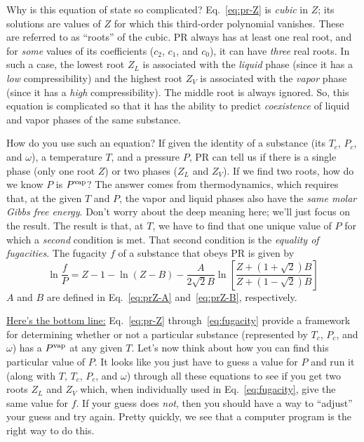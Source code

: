 \documentclass[11pt]{article}
\begin{document}
Why is this equation of state so complicated?  Eq.~\ref{eq:pr-Z} is {\em cubic} in $Z$; its solutions are values of $Z$ for which this third-order polynomial vanishes.  These are referred to as ``roots'' of the cubic.  PR always has at least one real root, and for {\em some} values of its coefficients ($c_2$, $c_1$, and $c_0$), it can have {\em three} real roots.  In such a case, the lowest root $Z_L$ is associated with the {\em liquid} phase (since it has a {\em low} compressibility) and the highest root $Z_V$ is associated with the {\em vapor} phase (since it has a {\em high} compressibility).  The middle root is always ignored.  So, this equation is complicated so that it has the ability to predict {\em coexistence} of liquid and vapor phases of the same substance.

How do you use such an equation? If given the identity of a substance (its $T_c$, $P_c$, and $\omega$), a temperature $T$, and a pressure $P$, PR can tell us if there is a single phase (only one root $Z$) or two phases ($Z_L$ and $Z_V$).  If we find two roots, how do we know $P$ is $P^{\rm vap}$?  The answer comes from thermodynamics, which requires that, at the given $T$ and $P$, the vapor and liquid phases also have the {\em same molar Gibbs free energy}.  Don't worry about the deep meaning here; we'll just focus on the result.  The result is that, at $T$, we have to find that one unique value of $P$ for which a {\em second} condition is met.  That second condition is the {\em equality of fugacities}.  The fugacity $f$ of a substance that obeys PR is given by
%
\begin{equation}\label{eq:fugacity}
\ln\frac{f}{P} = Z - 1 - \ln(Z-B) - \frac{A}{2\sqrt{2}B}\ln\left[\frac{Z+(1+\sqrt{2})B}{Z+(1-\sqrt{2})B}\right]
\end{equation}
%
$A$ and $B$ are defined in Eq.~\ref{eq:prZ-A} and~\ref{eq:prZ-B}, respectively.  

\underline{Here's the bottom line:}  Eq.~\ref{eq:pr-Z} through~\ref{eq:fugacity} provide a framework for determining whether or not a particular substance (represented by $T_c$, $P_c$, and $\omega$) has a $P^{\rm vap}$ at any given $T$.  Let's now think about how you can find this particular value of $P$.  It looks like you just have to guess a value for $P$ and run it (along with $T$, $T_c$, $P_c$, and $\omega$) through all these equations to see if you get two roots $Z_L$ and $Z_V$ which, when individually used in Eq.~\ref{eq:fugacity}, give the same value for $f$.  If your guess does {\em not}, then you should have a way to ``adjust'' your guess and try again.  Pretty quickly, we see that a computer program is the right way to do this.
\end{document}
